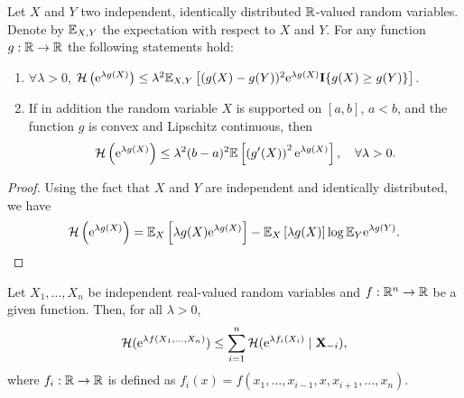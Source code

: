 \begin{definition}
\end{definition}
\begin{lemma}\label{lem:entropy-bound-univariate}
	Let \(X\) and \(Y\) two independent, identically distributed \(\mathbb{R}\)-valued random variables. Denote by \(\mathbb{E}_{X, Y}\) the expectation with respect to \(X\) and \(Y\). For any function \(g: \mathbb{R} \rightarrow \mathbb{R}\) the following statements hold:
	\begin{enumerate}
		\item \(\forall\lambda>0\), \(\mathcal{H}\left(\mathrm{e}^{\lambda g(X)}\right) \leq \lambda^2 \mathbb{E}_{X, Y}\left[(g(X)-g(Y))^2\mathrm{e}^{\lambda g(X)}\mathbf{I}\{g(X) \geq g(Y)\}\right]\).
		\item If in addition the random variable \(X\) is supported on \([a, b]\), \(a<b\), and the function \(g\) is convex and Lipschitz continuous, then
		      \begin{equation*}
			      \mathcal{H}\left(\mathrm{e}^{\lambda g(X)}\right) \leq \lambda^2(b-a)^2 \mathbb{E}\left[\left(g^{\prime}(X)\right)^2 \mathrm{e}^{\lambda g(X)}\right],\quad\forall\lambda>0.
		      \end{equation*}
	\end{enumerate}
\end{lemma}

\begin{proof}
	Using the fact that \(X\) and \(Y\) are independent and identically distributed, we have
	\begin{equation*}
		\mathcal{H}\left(\mathrm{e}^{\lambda g(X)}\right)=\mathbb{E}_{X}\left[\lambda g(X)\mathrm{e}^{\lambda g(X)}\right]-\mathbb{E}_{X}\left[\lambda g(X)\right]\log\mathbb{E}_{Y}\mathrm{e}^{\lambda g(Y)}.
	\end{equation*}
\end{proof}

\begin{lemma}\label{lem:tensorisation-entropy}
	Let \(X_{1}, \ldots, X_{n}\) be independent real-valued random variables and \(f:\mathbb{R}^{n}\to\mathbb{R}\) be a given function. Then, for all \(\lambda>0\),
	\begin{equation*}
		\mathcal{H}(\mathrm{e}^{\lambda f(X_{1}, \ldots, X_{n})})\leq\sum_{i=1}^{n}\mathcal{H}(\mathrm{e}^{\lambda f_{i}(X_{i})}\mid \mathbf{X}_{-i}),
	\end{equation*}
	where \(f_{i}:\mathbb{R}\to\mathbb{R}\) is defined as \(f_{i}(x)=f(x_{1}, \ldots, x_{i-1}, x, x_{i+1}, \ldots, x_{n})\).
\end{lemma}


